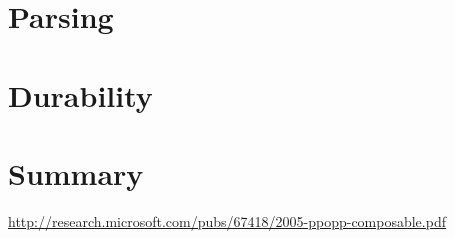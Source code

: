 \documentclass[10pt]{article}
\begin{document}
\begin{multicols}{2}
\section{Parsing}

\section{Durability}

\section{Summary}


\end{multicols}

\begin{thebibliography}{1}

 \url{http://research.microsoft.com/pubs/67418/2005-ppopp-composable.pdf}

\end{thebibliography}
\end{document}
